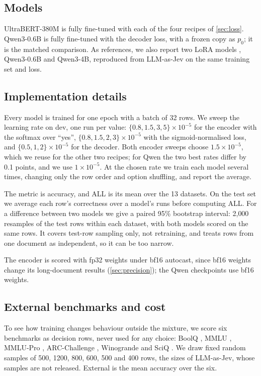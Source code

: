 \subsection{Models}
\label{sec:models}

UltraBERT-380M \citep{ultrabert} is fully fine-tuned with each of the four recipes of \cref{sec:loss}.
Qwen3-0.6B \citep{qwen3} is fully fine-tuned with the decoder loss, with a frozen copy as $p_0$; it is the matched comparison.
As references, we also report two LoRA models \citep{lora}, Qwen3-0.6B and Qwen3-4B, reproduced from LLM-as-Jev on the same training set and loss.

\subsection{Implementation details}
\label{sec:Implementation details}

Every model is trained for one epoch with a batch of 32 rows.
We sweep the learning rate on dev, one run per value: $\{0.8, 1.5, 3, 5\}\times10^{-5}$ for the encoder with the softmax over ``yes'', $\{0.8, 1.5, 2, 3\}\times10^{-5}$ with the sigmoid-normalised loss, and $\{0.5, 1, 2\}\times10^{-5}$ for the decoder.
Both encoder sweeps choose $1.5\times10^{-5}$, which we reuse for the other two recipes; for Qwen the two best rates differ by 0.1 points, and we use $1\times10^{-5}$.
At the chosen rate we train each model several times, changing only the row order and option shuffling, and report the average.

The metric is accuracy, and ALL is its mean over the 13 datasets.
On the test set we average each row's correctness over a model's runs before computing ALL.
For a difference between two models we give a paired 95\% bootstrap interval: 2{,}000 resamples of the test rows within each dataset, with both models scored on the same rows.
It covers test-row sampling only, not retraining, and treats rows from one document as independent, so it can be too narrow.

The encoder is scored with fp32 weights under bf16 autocast, since bf16 weights change its long-document results (\cref{sec:precision}); the Qwen checkpoints use bf16 weights.

\subsection{External benchmarks and cost}
\label{sec:external}

To see how training changes behaviour outside the mixture, we score six benchmarks as decision rows, never used for any choice: BoolQ \citep{boolq}, MMLU \citep{mmlu}, MMLU-Pro \citep{mmlupro}, ARC-Challenge \citep{arc}, Winogrande \citep{winogrande} and SciQ \citep{sciq}.
We draw fixed random samples of 500, 1200, 800, 600, 500 and 400 rows, the sizes of LLM-as-Jev, whose samples are not released.
External is the mean accuracy over the six.

